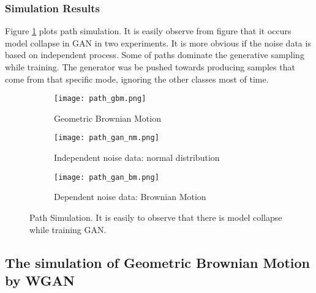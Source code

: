 \documentclass{article}
\begin{document}
	\subsubsection{Simulation Results}

	Figure \ref{fig:path_gan} plots path simulation.
	It is easily observe from figure that it occurs model collapse in GAN in two experiments.
	It is more obvious if the noise data is based on independent process. 
	Some of paths dominate the generative sampling while training.
	The generator was be pushed towards producing samples that come from that specific mode, ignoring the other classes most of time. 

	\begin{figure}
		\begin{subfigure}[b]{0.5\textwidth}
			\texttt{[image: path\_gbm.png]}
			\caption{Geometric Brownian Motion}
		\end{subfigure}
		\begin{subfigure}[b]{0.5\textwidth}
			\texttt{[image: path\_gan\_nm.png]}
			\caption{Independent noise data: normal distribution}
		\end{subfigure}
		\begin{subfigure}[b]{0.5\textwidth}
			\texttt{[image: path\_gan\_bm.png]}
			\caption{Dependent noise data: Brownian Motion}
		\end{subfigure}
	\caption{Path Simulation. It is easily to observe that there is model collapse while training GAN.}
	\label{fig:path_gan}
	\end{figure}

	\subsection{The simulation of Geometric Brownian Motion by WGAN}


	
	

	
	
	
	
	
	
\end{document}
